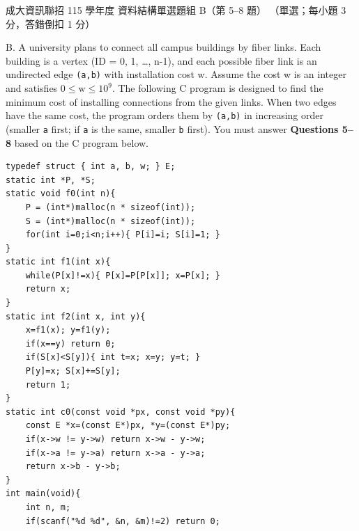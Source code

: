 \begin{pastexam}[label={px:ncku-115-prog-05}]{成大資訊聯招 115 學年度 資料結構單選題組 B（第 5--8 題）}
（單選；每小題 3 分，答錯倒扣 1 分）

B. A university plans to connect all campus buildings by fiber links. Each building is a vertex
(ID = 0, 1, \dots, n-1), and each possible fiber link is an undirected edge \texttt{(a,b)} with
installation cost w. Assume the cost w is an integer and satisfies $0 \le \mathrm{w} \le 10^9$. The
following C program is designed to find the minimum cost of installing connections from the given links.
When two edges have the same cost, the program orders them by \texttt{(a,b)} in increasing order (smaller
\texttt{a} first; if \texttt{a} is the same, smaller \texttt{b} first). You must answer
\textbf{Questions 5--8} based on the C program below.
\begin{verbatim}
typedef struct { int a, b, w; } E;
static int *P, *S;
static void f0(int n){
    P = (int*)malloc(n * sizeof(int));
    S = (int*)malloc(n * sizeof(int));
    for(int i=0;i<n;i++){ P[i]=i; S[i]=1; }
}
static int f1(int x){
    while(P[x]!=x){ P[x]=P[P[x]]; x=P[x]; }
    return x;
}
static int f2(int x, int y){
    x=f1(x); y=f1(y);
    if(x==y) return 0;
    if(S[x]<S[y]){ int t=x; x=y; y=t; }
    P[y]=x; S[x]+=S[y];
    return 1;
}
static int c0(const void *px, const void *py){
    const E *x=(const E*)px, *y=(const E*)py;
    if(x->w != y->w) return x->w - y->w;
    if(x->a != y->a) return x->a - y->a;
    return x->b - y->b;
}
int main(void){
    int n, m;
    if(scanf("%d %d", &n, &m)!=2) return 0;


\end{verbatim}
\end{pastexam}

